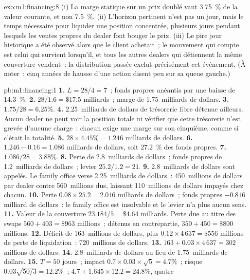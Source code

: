 \begin{solution}{exo:m1:financing:8}
(i) La marge statique sur un prix doublé vaut 3.75~\% de la valeur courante, et non 7.5~\%.
(ii) L'horizon pertinent n'est pas un jour, mais le temps nécessaire pour liquider une
position concentrée, plusieurs jours pendant lesquels les ventes propres du dealer
font bouger le prix. (iii) Le pire jour historique a été observé alors que le
client achetait~; le mouvement qui compte est celui qui survient lorsqu'il, et
tous les autres dealers qui détiennent la même couverture vendent~: la distribution passée
exclut précisément cet événement. (À noter~: cinq années de hausse d'une action disent peu
sur sa queue gauche.)
\end{solution}

\begin{solution}{pb:m1:financing:1}
\textbf{1.} $L = 28/4 = 7$~; fonds propres anéantis par une baisse de 14.3~\%.
\textbf{2.} $28/1.6 = \$17.5$ milliards~; marge de 1.75~milliards de dollars.
\textbf{3.} $1.75/28 = 6.25\%$.
\textbf{4.} 2.25~milliards de dollars de trésorerie libre détenue ailleurs. Aucun dealer ne peut voir la
position totale ni vérifier que cette trésorerie n'est grevée d'aucune charge~: chacun exige une marge sur
son cinquième, comme si c'était la totalité.
\textbf{5.} $28 \times 4.45\% = 1.246$ milliards de dollars.
\textbf{6.} $1.246 - 0.16 = 1.086$ milliards de dollars, soit 27.2~\% des fonds propres.
\textbf{7.} $1.086/28 = 3.88\%$.
\textbf{8.} Perte de 2.8~milliards de dollars~; fonds propres de 1.2~milliards de dollars~; levier $25.2/1.2 =
21$.
\textbf{9.} 2.8~milliards de dollars sont appelés. Le family office verse 2.25~milliards de dollars~:
450~millions de dollars par dealer contre 560~millions dus, laissant 110~millions
de dollars impayés chez chacun.
\textbf{10.} Perte $0.08 \times 25.2 = 2.016$ milliards de dollars~; fonds propres $-0.816$
milliard de dollars~: le family office est insolvable et le levier n'a plus aucun sens.
\textbf{11.} Valeur de la couverture $23.184/5 = \$4.64$ milliards. Perte due au titre des swaps
$560 + 403 = \$963$ millions~; détenus en contrepartie, $350 + 450 = \$800$ millions.
\textbf{12.} Déficit de 163~millions de dollars, plus $0.12 \times 4\,637 = \$556$
millions de perte de liquidation~: 720~millions de dollars.
\textbf{13.} $163 + 0.03 \times 4\,637 = 302$ millions de dollars.
\textbf{14.} 2.8~milliards de dollars au lieu de 1.75~milliards de dollars.
\textbf{15.} $T = 50$ jours~; impact $0.7\times0.03\times\sqrt5 = 4.7\%$~; risque
$0.03\sqrt{50/3} = 12.2\%$~;  $4.7 + 1.645\times12.2 = 24.8\%$, quatre

\end{solution}
